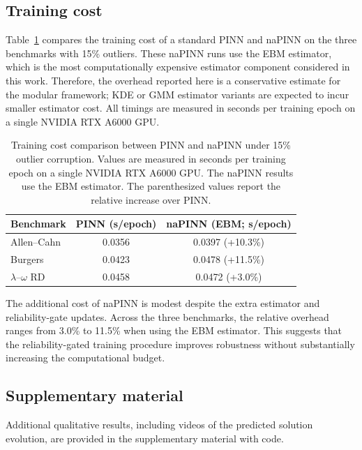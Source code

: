 \documentclass{article}
\theoremstyle{plain}
\theoremstyle{definition}
\theoremstyle{remark}
\begin{document}
\subsection{Training cost}
\label{appendix:training_cost}

Table~\ref{tab:training_cost} compares the training cost of a standard PINN and naPINN on the three benchmarks with 15\% outliers.
These naPINN runs use the EBM estimator, which is the most computationally expensive estimator component considered in this work.
Therefore, the overhead reported here is a conservative estimate for the modular framework; KDE or GMM estimator variants are expected to incur smaller estimator cost.
All timings are measured in seconds per training epoch on a single NVIDIA RTX A6000 GPU.

\begin{sc}
\begin{table}[t]
\centering
\small
\caption{Training cost comparison between PINN and naPINN under 15\% outlier corruption. Values are measured in seconds per training epoch on a single NVIDIA RTX A6000 GPU. The naPINN results use the EBM estimator. The parenthesized values report the relative increase over PINN.}
\label{tab:training_cost}
\setlength{\tabcolsep}{8pt}
\begin{tabular}{lcc}
\toprule
Benchmark & PINN (s/epoch) & naPINN (EBM; s/epoch) \\
\midrule
Allen--Cahn & 0.0356 & 0.0397 (+10.3\%) \\
Burgers & 0.0423 & 0.0478 (+11.5\%) \\
$\lambda$--$\omega$ RD & 0.0458 & 0.0472 (+3.0\%) \\
\bottomrule
\end{tabular}%
\end{table}
\end{sc}

The additional cost of naPINN is modest despite the extra estimator and reliability-gate updates.
Across the three benchmarks, the relative overhead ranges from 3.0\% to 11.5\% when using the EBM estimator.
This suggests that the reliability-gated training procedure improves robustness without substantially increasing the computational budget.

\subsection{Supplementary material}
Additional qualitative results, including videos of the predicted solution evolution, are provided in the supplementary material with code.
\end{document}
